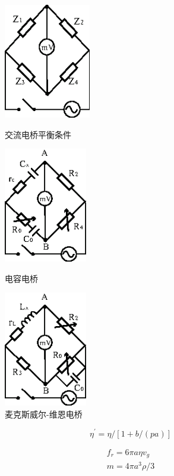 \documentclass[12pt,a4paper,UTF8]{ctexart}
\begin{document}
	\begin{figure}[htbp]
	\centering
	\begin{minipage}{0.3\textwidth}
	\centering
			\includegraphics[height=5cm]{img//1.eps}
			\caption{交流电桥平衡条件}
	\end{minipage}
	\hfill
	\begin{minipage}{0.3\textwidth}
	\centering
			\includegraphics[height=5cm]{img//2.eps}
			\caption{电容电桥}
	\end{minipage}
	\hfill
	\begin{minipage}{0.3\textwidth}
	\centering
			\includegraphics[height=5cm]{img//3.eps}
			\caption{麦克斯威尔-维恩电桥}
	\end{minipage}
	\end{figure}
		\begin{equation}
		\eta^{\prime}=\eta /[1+b /(p a)]
		\end{equation}

		\begin{gather}
		f_r=6\pi a \eta v_g   \\
		m=4 \pi a^{3} \rho / 3
		\end{gather}
\end{document}
